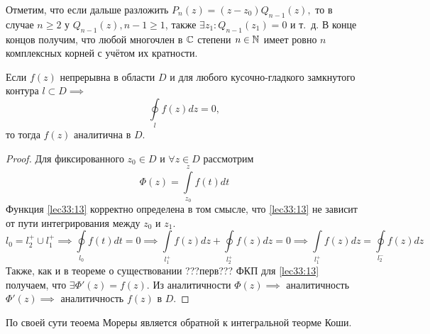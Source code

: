 \documentclass[../../main.tex]{subfiles}
\begin{document}
Отметим, что если дальше разложить $ P_n(z) = (z - z_0)Q_{n - 1}(z), $ 
то в случае $ n \geq 2 $ у $ Q_{n - 1}(z), n - 1 \geq 1 $, 
также $ \exists z_1 : Q_{n - 1}(z_1) = 0 $ и т.~д.
В конце концов получим, что любой многочлен в $ \mathbb{C} $ степени $ n \in \mathbb{N} $ имеет 
ровно $ n $ комплексных корней с учётом их кратности.

\begin{thm}[Мореры]
	Если $ f(z) $ непрерывна в области $ D $ и для любого кусочно-гладкого 
	замкнутого контура $ l \subset D \implies $
	\begin{equation}
	\label{lec33:12}
	\oint\limits_l f(z) dz = 0,
	\end{equation}
	то тогда $ f(z) $ аналитична в $ D $.
\end{thm}
\begin{proof}
	Для фиксированного $ z_0 \in D $ и
	$ \forall z \in D $ рассмотрим 
	\begin{equation}
	\label{lec33:13}
	\Phi(z) =
	\int\limits_{z_0}^{z} f(t) dt
	\end{equation}
	Функция \eqref{lec33:13} корректно определена в том смысле, 
	что \eqref{lec33:13} не зависит от пути интегрирования между $z_0$ и $z_1$.\\
	\[
	l_0 = l_2^+ \cup l_1^+ \implies
	\oint\limits_{l_0} f(t) dt = 0 \implies
	\int\limits_{l_1^+} f(z) dz +
	\oint\limits_{l_2^+} f(z) dz = 0 \implies 
	\int\limits_{l_1^+} f(z) dz =
	\oint\limits_{l_2^-} f(z) dz
	\]
	Также, как и в теореме о существовании ???перв???
	ФКП для \eqref{lec33:13} получаем, что $ \exists \Phi'(z) = f(z) $. 
	Из аналитичности $ \Phi(z) \implies $ 
	аналитичность $ \Phi'(z) \implies $
	аналитичность $ f(z) $ в $ D $.
\end{proof}
\begin{rem}
	По своей сути теоема Мореры является обратной
	к интегральной теорме Коши.
\end{rem}
\end{document}
